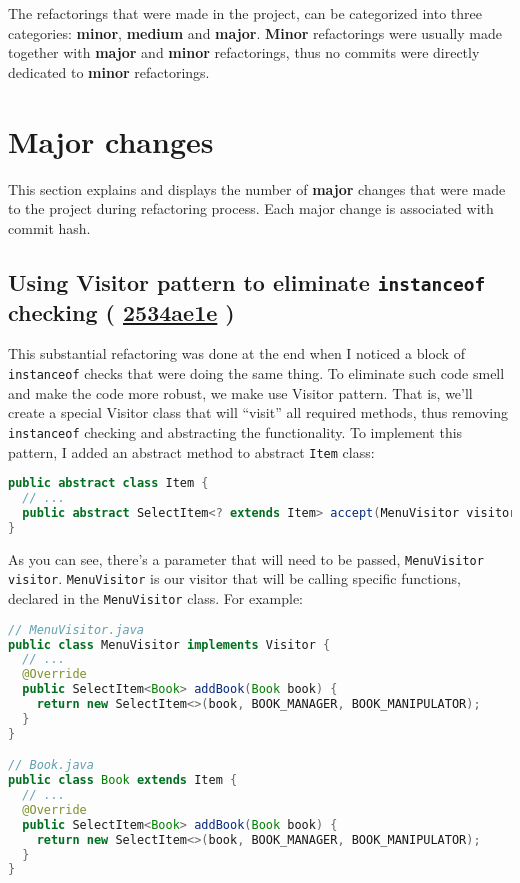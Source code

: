 \documentclass{article}
\renewcommand{\b}[1]{\textbf{#1}}
\newcommand{\code}[1]{\texttt{#1}}
\newcommand{\gh}[1]{%
  \href{https://github.com/awave1/assessment-loan-system/commit/#1}{#1}%
}
\begin{document}
  The refactorings that were made in the project, can be categorized into three categories: \b{minor}, \b{medium} and \b{major}. \b{Minor} refactorings were usually made together with \b{major} and \b{minor} refactorings, thus no commits were directly dedicated to \b{minor} refactorings.

\newpage

\section*{Major changes}

This section explains and displays the number of \b{major} changes that were made to the project during refactoring process. Each major change is associated with commit hash.

\subsection*{Using Visitor pattern to eliminate \code{instanceof} checking (\gh{2534ae1e})}
This substantial refactoring was done at the end when I noticed a block of \code{instanceof} checks that were doing the same thing. To eliminate such code smell and make the code more robust, we make use Visitor pattern. That is, we'll create a special Visitor class that will ``visit'' all required methods, thus removing \code{instanceof} checking and abstracting the functionality. To implement this pattern, I added an abstract method to abstract \code{Item} class:

\begin{lstlisting}[language=Java]
public abstract class Item {
  // ...
  public abstract SelectItem<? extends Item> accept(MenuVisitor visitor);
}
\end{lstlisting}

\noindent As you can see, there's a parameter that will need to be passed, \code{MenuVisitor visitor}. \code{MenuVisitor} is our visitor that will be calling specific functions, declared in the \code{MenuVisitor} class. For example:

\begin{lstlisting}[language=Java]
// MenuVisitor.java
public class MenuVisitor implements Visitor {
  // ...
  @Override
  public SelectItem<Book> addBook(Book book) {
    return new SelectItem<>(book, BOOK_MANAGER, BOOK_MANIPULATOR);
  }
}

// Book.java
public class Book extends Item {
  // ...
  @Override
  public SelectItem<Book> addBook(Book book) {
    return new SelectItem<>(book, BOOK_MANAGER, BOOK_MANIPULATOR);
  }
}
\end{lstlisting}
\end{document}
